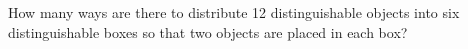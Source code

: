 \documentclass[../main.tex]{subfiles}
\begin{document}
How many ways are there to distribute 12 distinguishable objects into six distinguishable boxes so that two objects are placed in each box?

\solution
\end{document}
